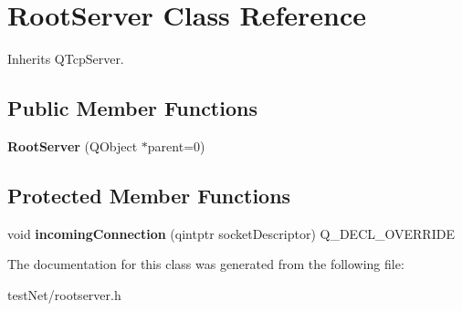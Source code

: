 \hypertarget{class_root_server}{\section{Root\-Server Class Reference}
\label{class_root_server}
}


Inherits Q\-Tcp\-Server.

\subsection*{Public Member Functions}
\begin{DoxyCompactItemize}
\item 
\hypertarget{class_root_server_a767bfac5c6cd83158c222c7804d99856}{{\bfseries Root\-Server} (Q\-Object $\ast$parent=0)}\label{class_root_server_a767bfac5c6cd83158c222c7804d99856}

\end{DoxyCompactItemize}
\subsection*{Protected Member Functions}
\begin{DoxyCompactItemize}
\item 
\hypertarget{class_root_server_a5a7531987f33679d44d2f8509593659c}{void {\bfseries incoming\-Connection} (qintptr socket\-Descriptor) Q\-\_\-\-D\-E\-C\-L\-\_\-\-O\-V\-E\-R\-R\-I\-D\-E}\label{class_root_server_a5a7531987f33679d44d2f8509593659c}

\end{DoxyCompactItemize}


The documentation for this class was generated from the following file\-:\begin{DoxyCompactItemize}
\item 
test\-Net/rootserver.\-h\end{DoxyCompactItemize}
